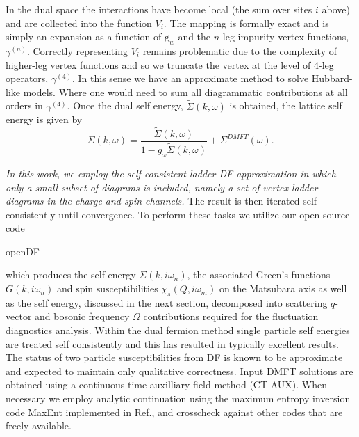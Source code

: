 \documentclass[twocolumn,notitlepage,prb,superscriptaddress,showpacs]{revtex4-1}
\begin{document}
In the dual space the interactions have become local (the sum over sites $i$ above) and are collected into the function $V_i$.  
The mapping is formally exact and is simply an expansion as a function of  $\text{g}_w$ and the $n$-leg impurity vertex functions, $\gamma^{(n)}$. 
Correctly representing $V_i$ remains problematic due to the complexity of higher-leg vertex functions\cite{ribic:2017} and so we truncate the vertex at the level of 4-leg operators, $\gamma^{(4)}$.
In this sense we have an approximate method to solve Hubbard-like models.   Where one would need to sum all diagrammatic contributions at all orders in $\gamma^{(4)}$.\cite{iskakov:2016,gukelberger:2017, rohringer:revmodphys} Once the dual self energy, $\tilde{\Sigma}(k,\omega)$ is obtained, the lattice self energy is given by
\begin{equation}
\Sigma(k,\omega)=\frac{\tilde{\Sigma}(k,\omega)}{1-g_{\omega}\tilde{\Sigma}(k,\omega) }+\Sigma^{DMFT}(\omega).
\label{eqn:dualselfenergy}
\end{equation}

\emph{In this work, we employ the self consistent ladder-DF approximation in which only a small subset of diagrams is included, namely a set of vertex ladder diagrams in the charge and spin channels. }
The result is then iterated self consistently until convergence.
To perform these tasks we utilize our open source code \begin{tt}openDF\end{tt}\cite{Antipov15} which produces the self energy $\Sigma(k,i\omega_n)$, the associated Green's functions $G(k,i\omega_n)$ and spin susceptibilities $\chi_s(Q,i\omega_m)$ on the Matsubara axis as well as the self energy, discussed in the next section, decomposed into scattering $q$-vector and bosonic frequency $\Omega$ contributions required for the fluctuation diagnostics analysis. 
Within the dual fermion method single particle self energies are treated self consistently  and this has resulted in typically excellent results.\cite{gukelberger:2017,benchmarks} The status of two particle susceptibilities from DF is known to be approximate and expected to maintain only qualitative correctness.\cite{leblanc:2019}
Input DMFT solutions are obtained using a continuous time auxilliary field method (CT-AUX).\cite{gull:2011}  When necessary we employ analytic continuation using the maximum entropy inversion code MaxEnt implemented in Ref., and crosscheck against other codes that are freely available.\cite{Gaenko17,wallerberger:2018,triqs} 
\end{document}
